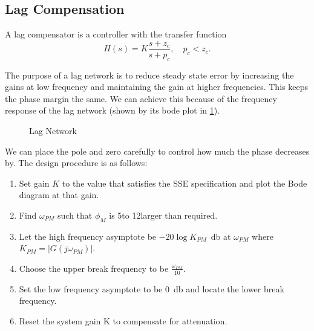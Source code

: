 \subsection{Lag Compensation}
\begin{definition}
  A lag compensator is a controller with the transfer function
  \[
	H(s) = K \frac{s+z_c}{s+p_c},\quad p_c < z_c.
  \]
  \label{defn:lag-network}
\end{definition}
The purpose of a lag network is to reduce steady state error by increasing the gains at low frequency and maintaining the gain at higher frequencies. This keeps the phase margin the same.
We can achieve this because of the frequency response of the lag network (shown by its bode plot in \cref{fig:lag-network}).

\begin{gitbook-image}
\begin{figure}
  \centering
  \caption{Lag Network}
  \label{fig:lag-network}
\end{figure}
\end{gitbook-image}
We can place the pole and zero carefully to control how much the phase decreases by. The design procedure is as follows:
\begin{enumerate}
  \item Set gain $K$ to the value that satisfies the SSE specification and plot the Bode diagram at that gain.
  \item Find $\omega_{PM}$ such that $\phi_M$ is 5\textdegree  to 12\textdegree  larger than required.
  \item Let the high frequency asymptote be $-20\log K_{PM}$\SI{}{\decibel} at $\omega_{PM}$ where $K_{PM} = |G(j\omega_{PM})|$.
  \item Choose the upper break frequency to be $\frac{\omega_{PM}}{10}$.
  \item Set the low frequency asymptote to be \SI{0}{\decibel} and locate the lower break frequency.
  \item Reset the system gain K to compensate for attenuation.
\end{enumerate}
